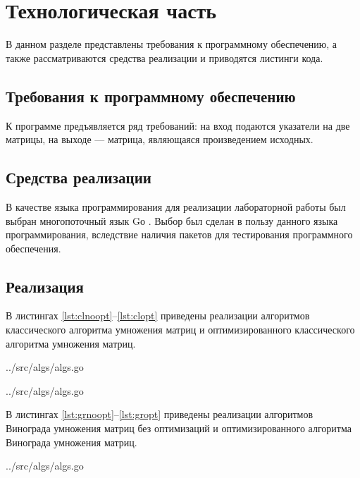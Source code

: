 \chapter{Технологическая часть}

В данном разделе представлены требования к программному обеспечению, а также рассматриваются средства реализации и приводятся листинги кода.

\section{Требования к программному обеспечению}

К программе предъявляется ряд требований: на вход подаются указатели на две матрицы, на выходе --- матрица, являющаяся произведением исходных.

\section{Средства реализации}

В качестве языка программирования для реализации лабораторной работы был выбран многопоточный язык Gо \cite{golang}. Выбор был сделан в пользу данного языка программирования, вследствие наличия пакетов для тестирования программного обеспечения.

\section{Реализация}

В листингах \ref{lst:clnoopt}--\ref{lst:clopt} приведены реализации алгоритмов классического алгоритма умножения матриц и оптимизированного классического алгоритма умножения матриц.
\newpage

\begin{lstinputlisting}[
	caption={Классический алгоритм умножения матриц без оптимизаций},
	label={lst:clnoopt},
	style={go},
	linerange={7-19},
	]{../src/algs/algs.go}
\end{lstinputlisting}

\begin{lstinputlisting}[
	caption={Классический алгоритм умножения матриц с оптимизациями},
	label={lst:clopt},
	style={go},
	linerange={21-33},
	]{../src/algs/algs.go}
\end{lstinputlisting}
\newpage

В листингах \ref{lst:grnoopt}--\ref{lst:gropt} приведены реализации алгоритмов Винограда умножения матриц без оптимизаций и оптимизированного алгоритма Винограда умножения матриц.
\begin{lstinputlisting}[
	caption={Алгоритм Винограда умножения матриц без оптимизаций},
	label={lst:grnoopt},
	style={go},
	linerange={35-73},
	]{../src/algs/algs.go}
\end{lstinputlisting}

